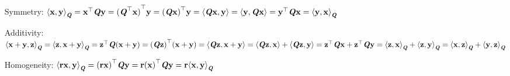 \documentclass[10pt]{article}
\begin{document}
\begin{enumerate}
\begin{enumerate}
        \item [Symmetry:] ${\langle \mathbf{x},\mathbf{y}\rangle}_\textbf{\textit{Q}}=\mathbf{x}^\top\textbf{\textit{Q}}\mathbf{y}={(\textbf{\textit{Q}}^\top\mathbf{x})}^\top\mathbf{y}={(\textbf{\textit{Q}}\mathbf{x})}^\top\mathbf{y}=\langle\textbf{\textit{Q}}\mathbf{x},\mathbf{y}\rangle=\langle\mathbf{y},\textbf{\textit{Q}}\mathbf{x}\rangle=\mathbf{y}^\top\textbf{\textit{Q}}\mathbf{x}={\langle\mathbf{y},\mathbf{x}\rangle}_\textbf{\textit{Q}}$
        \item [Additivity:] ${\langle \mathbf{x}+\mathbf{y},\mathbf{z}\rangle}_\textbf{\textit{Q}}={\langle \mathbf{z},\mathbf{x}+\mathbf{y}\rangle}_\textbf{\textit{Q}}={\mathbf{z}}^\top\textbf{\textit{Q}}(\mathbf{x}+\mathbf{y})={(\textbf{\textit{Q}}\mathbf{z})}^\top(\mathbf{x}+\mathbf{y})\\
        =\langle\textbf{\textit{Q}}\mathbf{z},\mathbf{x}+\mathbf{y}\rangle=\langle\textbf{\textit{Q}}\mathbf{z},\mathbf{x}\rangle+\langle\textbf{\textit{Q}}\mathbf{z},\mathbf{y}\rangle=\mathbf{z}^\top\textbf{\textit{Q}}\mathbf{x}+\mathbf{z}^\top\textbf{\textit{Q}}\mathbf{y}\\
        ={\langle \mathbf{z},\mathbf{x}\rangle}_\textbf{\textit{Q}}+{\langle \mathbf{z},\mathbf{y}\rangle}_\textbf{\textit{Q}}={\langle \mathbf{x},\mathbf{z}\rangle}_\textbf{\textit{Q}}+{\langle \mathbf{y},\mathbf{z}\rangle}_\textbf{\textit{Q}}$
        \item [Homogeneity:] ${\langle \mathbf{rx},\mathbf{y}\rangle}_\textbf{\textit{Q}}={(\mathbf{rx})}^\top\textbf{\textit{Q}}\mathbf{y}=\mathbf{r}{(\mathbf{x})}^\top\textbf{\textit{Q}}\mathbf{y}=\mathbf{r}{\langle \mathbf{x},\mathbf{y}\rangle}_\textbf{\textit{Q}}$
    \end{enumerate}
\end{enumerate}
\end{document}
